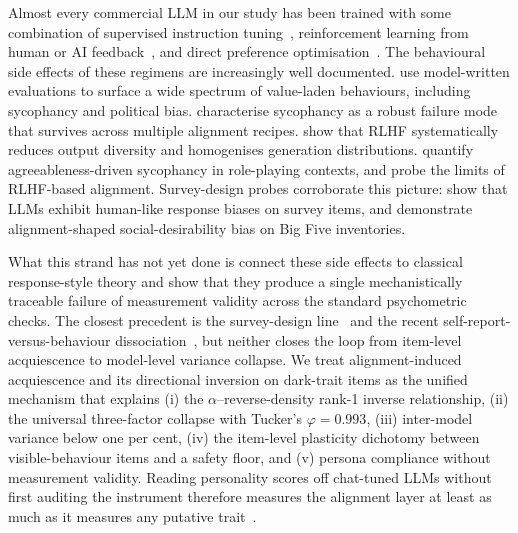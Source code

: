 \documentclass[11pt]{article}
\begin{document}
Almost every commercial LLM in our study has been trained with some combination of supervised instruction tuning~\citep{wei2022flan,ouyang2022training}, reinforcement learning from human or AI feedback~\citep{christiano2017deep,ouyang2022training,bai2022constitutional}, and direct preference optimisation~\citep{rafailov2023dpo}. The behavioural side effects of these regimens are increasingly well documented. \citet{perez2023discovering} use model-written evaluations to surface a wide spectrum of value-laden behaviours, including sycophancy and political bias. \citet{sharma2024sycophancy} characterise sycophancy as a robust failure mode that survives across multiple alignment recipes. \citet{kirk2023understanding} show that RLHF systematically reduces output diversity and homogenises generation distributions. \citet{zheng2024agreeableness} quantify agreeableness-driven sycophancy in role-playing contexts, and \citet{wang2024aligning} probe the limits of RLHF-based alignment. Survey-design probes corroborate this picture: \citet{tjuatja2023response} show that LLMs exhibit human-like response biases on survey items, and \citet{acerbi2024llm,salecha2024llm} demonstrate alignment-shaped social-desirability bias on Big Five inventories.

What this strand has not yet done is connect these side effects to classical response-style theory and show that they produce a single mechanistically traceable failure of measurement validity across the standard psychometric checks. The closest precedent is the survey-design line~\citep{tjuatja2023response,dominguez2024questioning} and the recent self-report-versus-behaviour dissociation~\citep{han2025personality}, but neither closes the loop from item-level acquiescence to model-level variance collapse. We treat alignment-induced acquiescence and its directional inversion on dark-trait items as the unified mechanism that explains (i) the $\alpha$--reverse-density rank-1 inverse relationship, (ii) the universal three-factor collapse with Tucker's $\varphi=0.993$, (iii) inter-model variance below one per cent, (iv) the item-level plasticity dichotomy between visible-behaviour items and a safety floor, and (v) persona compliance without measurement validity. Reading personality scores off chat-tuned LLMs without first auditing the instrument therefore measures the alignment layer at least as much as it measures any putative trait~\citep{serpell2024validity,laverghetta2022predicting}.

\end{document}
